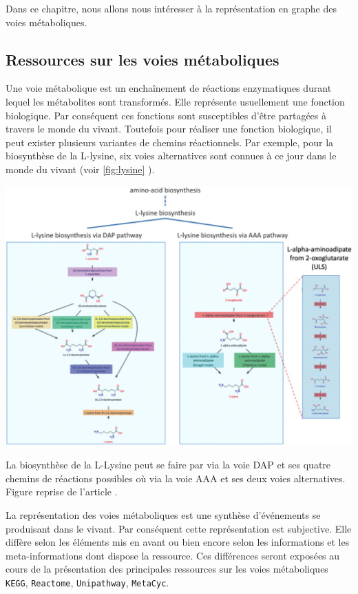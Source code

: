 \begin{refsegment}
\begin{itemize}
    \end{itemize}
    Dans ce chapitre, nous allons nous intéresser à la représentation en graphe des voies métaboliques. 
    
    \subsection{Ressources sur les voies métaboliques}
    
    Une voie métabolique est un enchaînement de réactions enzymatiques durant lequel les métabolites sont transformés. Elle représente usuellement une fonction biologique. Par conséquent ces fonctions sont susceptibles d'être partagées à travers le monde du vivant. Toutefois pour réaliser une fonction biologique, il peut exister plusieurs variantes de chemins réactionnels. Par exemple, pour la biosynthèse de la L-lysine, six voies alternatives sont connues à ce jour dans le monde du vivant (voir \cref{fig:lysine} ).
    	
    	
   	\begin{shadedfigure}[H]
   		\centering
   		\includegraphics[width=\textwidth]{img/L-lysine-biosynthesis.jpg}
   		\caption{La biosynthèse de la L-Lysine peut se faire par via la voie DAP et ses quatre chemins de réactions possibles où via la voie AAA et ses deux voies alternatives. Figure reprise de l'article . }
   		\label{fig:lysine}
   	\end{shadedfigure}
     
     La représentation des voies métaboliques est une synthèse d'événements se produisant dans le vivant. Par conséquent cette représentation est subjective. Elle diffère selon les éléments mis en avant ou bien encore selon les informations et les meta-informations dont dispose la ressource. Ces différences seront exposées au cours de la présentation des principales ressources sur les voies métaboliques \texttt{\gls{KEGG}}, \texttt{Reactome}, \texttt{Unipathway}, \texttt{MetaCyc}.
     

\end{refsegment}
